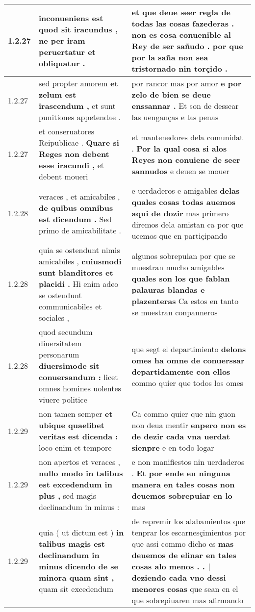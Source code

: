 \begin{tabular}{|p{1cm}|p{6.5cm}|p{6.5cm}|}
1.2.27 & inconueniens est \textbf{ quod sit iracundus , } ne per iram peruertatur et obliquatur . & et que deue seer regla de todas las cosas fazederas . \textbf{ non es cosa conuenible al Rey de ser sañudo . } por que por la saña non sea tristornado nin torçido . \\\hline
1.2.27 & sed propter amorem \textbf{ et zelum est irascendum , } et sunt punitiones appetendae . & por rancor mas por amor \textbf{ e por zelo de bien se deue enssannar . } Et son de dessear las uenganças e las penas \\\hline
1.2.27 & et conseruatores Reipublicae . \textbf{ Quare si Reges non debent esse iracundi , } et debent moueri & et mantenedores dela comunidat . \textbf{ Por la qual cosa si alos Reyes non conuiene de seer sannudos } e deuen se mouer \\\hline
1.2.28 & veraces , et amicabiles , \textbf{ de quibus omnibus est dicendum . } Sed primo de amicabilitate . & e uerdaderos e amigables \textbf{ delas quales cosas todas auemos aqui de dozir } mas primero diremos dela amistan ca por que ueemos que en partiçipando \\\hline
1.2.28 & quia se ostendunt nimis amicabiles , \textbf{ cuiusmodi sunt blanditores et placidi . } Hi enim adeo se ostendunt communicabiles et sociales , & algunos sobrepuian por que se muestran mucho amigables \textbf{ quales son los que fablan palauras blandas e plazenteras } Ca estos en tanto se muestran conpanneros \\\hline
1.2.28 & quod secundum diuersitatem personarum \textbf{ diuersimode sit conuersandum : } licet omnes homines uolentes viuere politice & que segt el departimiento \textbf{ delons omes ha omne de conuerssar departidamente con ellos } commo quier que todos los omes \\\hline
1.2.29 & non tamen semper \textbf{ et ubique quaelibet veritas est dicenda : } loco enim et tempore & Ca commo quier que nin guon non deua mentir \textbf{ enpero non es de dezir cada vna uerdat sienpre } e en todo logar \\\hline
1.2.29 & non apertos et veraces , \textbf{ nullo modo in talibus est excedendum in plus , } sed magis declinandum in minus : & e non manifiestos nin uerdaderos . \textbf{ Et por ende en ninguna manera en tales cosas non deuemos sobrepuiar en lo } mas \\\hline
1.2.29 & quia ( ut dictum est ) \textbf{ in talibus magis est declinandum in minus dicendo de se minora quam sint , } quam sit excedendum & de repremir los alabamientos que tenprar los escarnesçimientos por que assi commo dicho es \textbf{ mas deuemos de elinar en tales cosas alo menos . . | deziendo cada vno dessi menores cosas } que sean en el que sobrepiuaren mas afirmando \\\hline

\end{tabular}
